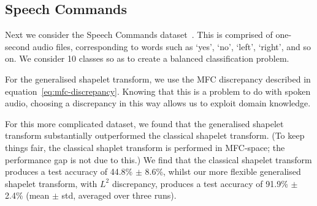 \documentclass{article}
\theoremstyle{plain}
\theoremstyle{definition}
\begin{document}
\subsection{Speech Commands}
Next we consider the Speech Commands dataset~\cite{warden2018speech}. This is comprised of one-second audio files, corresponding to words such as `yes', `no', `left', `right', and so on. We consider 10 classes so as to create a balanced classification problem.

For the generalised shapelet transform, we use the MFC discrepancy described in equation~\eqref{eq:mfc-discrepancy}. Knowing that this is a problem to do with spoken audio, choosing a discrepancy in this way allows us to exploit domain knowledge.

For this more complicated dataset, we found that the generalised shapelet transform substantially outperformed the classical shapelet transform. (To keep things fair, the classical shaplet transform is performed in MFC-space; the performance gap is not due to this.) We find that  the classical shapelet transform produces a test accuracy of 44.8\% $\pm$ 8.6\%, whilst our more flexible generalised shapelet transform, with $L^2$ discrepancy, produces a test accuracy of 91.9\% $\pm$ 2.4\% (mean $\pm$ std, averaged over three runs).
\end{document}
